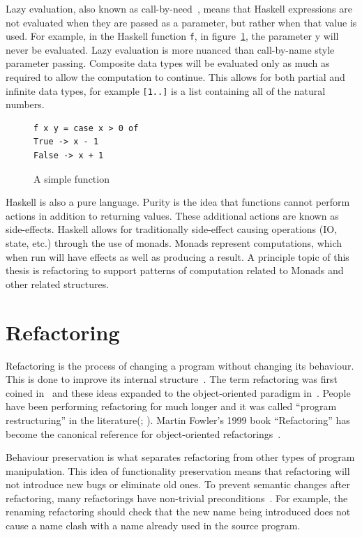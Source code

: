 Lazy evaluation, also known as call-by-need~\citep{wadsworth}, means that Haskell expressions are not evaluated when they are passed as a parameter, but rather when that value is used. For example, in the Haskell function \texttt{f}, in figure~\ref{lazyY}, the parameter y will never be evaluated. Lazy evaluation is more nuanced than call-by-name style parameter passing. Composite data types will be evaluated only as much as required to allow the computation to continue. This allows for both partial and infinite data types, for example \texttt{[1..]} is a list containing all of the natural numbers. 

\begin{figure}[t]
\begin{lstlisting}
f x y = case x > 0 of
True -> x - 1
False -> x + 1
\end{lstlisting}
\caption{A simple function}
\label{lazyY}
\end{figure}

Haskell is also a pure language. Purity is the idea that functions cannot perform actions in addition to returning values. These additional actions are known as side-effects. Haskell allows for traditionally side-effect causing operations (IO, state, etc.) through the use of monads. Monads represent computations, which when run will have effects as well as producing a result. A principle topic of this thesis is refactoring to support patterns of computation related to Monads and other related structures. 

\section{Refactoring} 
Refactoring is the process of changing a program without changing its behaviour. This is done to improve its internal structure~\citep{fowler}. The term refactoring was first coined in~\citep{programRestructuring} and these ideas expanded to the object-oriented paradigm in~\citep{refactOOFrameworks}. People have been performing refactoring for much longer and it was called ``program restructuring'' in the literature(\cite{highSpeedRestructuring}; \cite{performanceRestructuring}). Martin Fowler's 1999 book ``Refactoring'' has become the canonical reference for object-oriented refactorings~\citep{fowler}.

Behaviour preservation is what separates refactoring from other types of program manipulation. This idea of functionality preservation means that refactoring will not introduce new bugs or eliminate old ones. To prevent semantic changes after refactoring, many refactorings have non-trivial preconditions~\citep{mens2002formalising}. For example, the renaming refactoring should check that the new name being introduced does not cause a name clash with a name already used in the source program.

